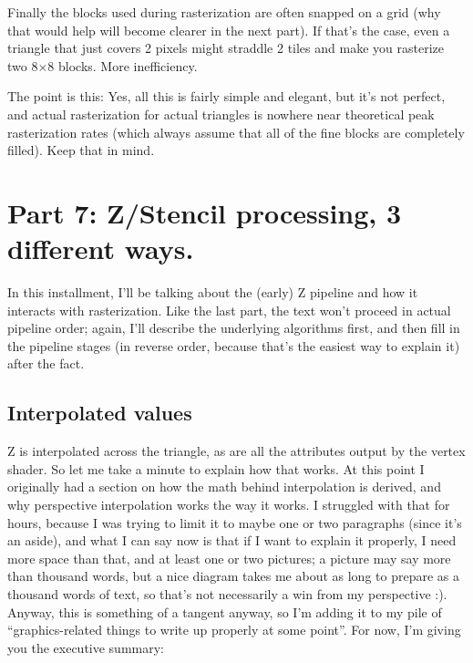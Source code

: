 \documentclass[12pt]{article}
\begin{document}
Finally the blocks used during rasterization are often snapped on a grid (why that would help will become clearer in the next part). If that’s the case, even a triangle that just covers 2 pixels might straddle 2 tiles and make you rasterize two 8×8 blocks. More inefficiency.

The point is this: Yes, all this is fairly simple and elegant, but it’s not perfect, and actual rasterization for actual triangles is nowhere near theoretical peak rasterization rates (which always assume that all of the fine blocks are completely filled). Keep that in mind.

\section{Part 7: Z/Stencil processing, 3 different ways.}
\label{sec:orgccefd53}
\label{part7}

In this installment, I’ll be talking about the (early) Z pipeline and how it interacts with rasterization. Like the last part, the text won’t proceed in actual pipeline order; again, I’ll describe the underlying algorithms first, and then fill in the pipeline stages (in reverse order, because that’s the easiest way to explain it) after the fact.

\subsection{Interpolated values}
\label{sec:org8332d29}

Z is interpolated across the triangle, as are all the attributes output by the vertex shader. So let me take a minute to explain how that works. At this point I originally had a section on how the math behind interpolation is derived, and why perspective interpolation works the way it works. I struggled with that for hours, because I was trying to limit it to maybe one or two paragraphs (since it’s an aside), and what I can say now is that if I want to explain it properly, I need more space than that, and at least one or two pictures; a picture may say more than thousand words, but a nice diagram takes me about as long to prepare as a thousand words of text, so that’s not necessarily a win from my perspective :). Anyway, this is something of a tangent anyway, so I’m adding it to my pile of “graphics-related things to write up properly at some point”. For now, I’m giving you the executive summary:
\end{document}
